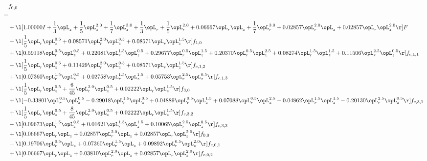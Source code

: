 \begin{alignat}{2} 
\label{eq:f_00_1} 
& f_{0,0} \nonumber \\ 
 = \\ 
& + \l[  1.00000 I + \frac{1}{3} \opL_z + \frac{1}{5} \opL_z^{2.0} + \frac{1}{7} \opL_z^{3.0} + \frac{1}{3} \opL_r + \frac{1}{5} \opL_r^{2.0} +  0.06667 \opL_r \opL_z + \frac{1}{7} \opL_r^{3.0} +  0.02857 \opL_r^{2.0} \opL_z +  0.02857 \opL_r \opL_z^{2.0}  \r] F \nonumber \\ 
& - \l[ \frac{1}{5} \opL_r \opL_z^{0.5} +  0.08571 \opL_r^{2.0} \opL_z^{0.5} +  0.08571 \opL_r \opL_z^{1.5}  \r] f_{1,0} \nonumber \\ 
& + \l[  0.59118 \opL_r^{0.5} \opL_z^{0.5} +  0.22081 \opL_r^{1.5} \opL_z^{0.5} +  0.29677 \opL_r^{0.5} \opL_z^{1.5} +  0.20370 \opL_r^{0.5} \opL_z^{2.5} +  0.08274 \opL_r^{1.5} \opL_z^{1.5} +  0.11506 \opL_r^{2.5} \opL_z^{0.5}  \r] f_{c,1,1} \nonumber \\ 
& - \l[ \frac{1}{5} \opL_r \opL_z^{0.5} +  0.11429 \opL_r^{2.0} \opL_z^{0.5} +  0.08571 \opL_r \opL_z^{1.5}  \r] f_{c,1,2} \nonumber \\ 
& + \l[  0.07360 \opL_r^{1.5} \opL_z^{0.5} +  0.02758 \opL_r^{1.5} \opL_z^{1.5} +  0.05753 \opL_r^{2.5} \opL_z^{0.5}  \r] f_{c,1,3} \nonumber \\ 
& + \l[ \frac{1}{5} \opL_r \opL_z^{0.5} + \frac{6}{45} \opL_r^{2.0} \opL_z^{0.5} +  0.02222 \opL_r \opL_z^{1.5}  \r] f_{3,0} \nonumber \\ 
& + \l[  -0.33801 \opL_r^{0.5} \opL_z^{0.5}   -0.29018 \opL_r^{1.5} \opL_z^{0.5} +  0.04889 \opL_r^{0.5} \opL_z^{1.5} +  0.07088 \opL_r^{0.5} \opL_z^{2.5}   -0.04862 \opL_r^{1.5} \opL_z^{1.5}   -0.20130 \opL_r^{2.5} \opL_z^{0.5}  \r] f_{c,3,1} \nonumber \\ 
& + \l[ \frac{1}{5} \opL_r \opL_z^{0.5} + \frac{8}{45} \opL_r^{2.0} \opL_z^{0.5} +  0.02222 \opL_r \opL_z^{1.5}  \r] f_{c,3,2} \nonumber \\ 
& - \l[  0.09673 \opL_r^{1.5} \opL_z^{0.5} +  0.01621 \opL_r^{1.5} \opL_z^{1.5} +  0.10065 \opL_r^{2.5} \opL_z^{0.5}  \r] f_{c,3,3} \nonumber \\ 
& + \l[  0.06667 \opL_r \opL_z +  0.02857 \opL_r^{2.0} \opL_z +  0.02857 \opL_r \opL_z^{2.0}  \r] f_{0,0} \nonumber \\ 
& - \l[  0.19706 \opL_r^{0.5} \opL_z +  0.07360 \opL_r^{1.5} \opL_z +  0.09892 \opL_r^{0.5} \opL_z^{2.0}  \r] f_{c,0,1} \nonumber \\ 
& + \l[  0.06667 \opL_r \opL_z +  0.03810 \opL_r^{2.0} \opL_z +  0.02857 \opL_r \opL_z^{2.0}  \r] f_{c,0,2} \nonumber \\ 

\end{alignat}
